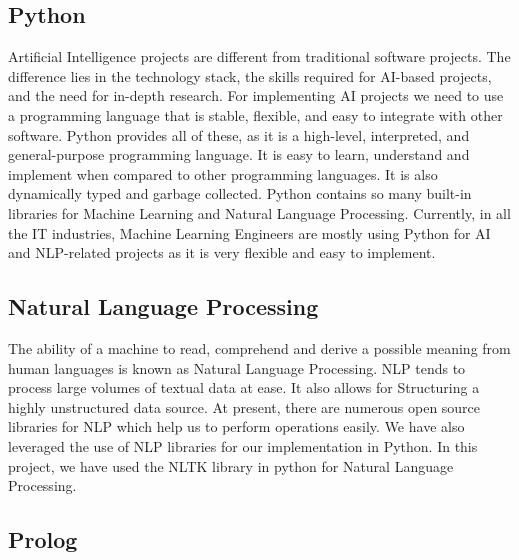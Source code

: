 \documentclass{article}
\begin{document}
\subsection{Python}

Artificial Intelligence projects are different from traditional software projects. The difference lies in the technology stack, the skills required for AI-based projects, and the need for in-depth research. For
implementing AI projects we need to use a programming language that is stable, flexible, and easy to integrate with other software. Python provides all of these, as it is a high-level, interpreted, and general-purpose programming language. It is easy to learn, understand and implement when compared to other programming languages. It is also dynamically typed and garbage collected.\cite{pythonWelcomePythonorg} Python contains so many built-in libraries for Machine Learning and Natural Language Processing. Currently, in all the IT industries, Machine Learning Engineers are mostly using Python for AI and NLP-related projects as it is very flexible and easy to implement.    

\subsection{Natural Language Processing}

The ability of a machine to read, comprehend and derive a possible meaning from human languages is known as Natural Language Processing. NLP tends to process large volumes of textual data at ease. It also allows for Structuring a highly unstructured data source.\cite{ibmWhatNatural} At present, there are numerous open source libraries for NLP which help us to perform operations easily. We have also leveraged the use of NLP libraries for our implementation in Python. In this project, we have used the NLTK library in python for Natural Language Processing.


\subsection{Prolog}
\end{document}
